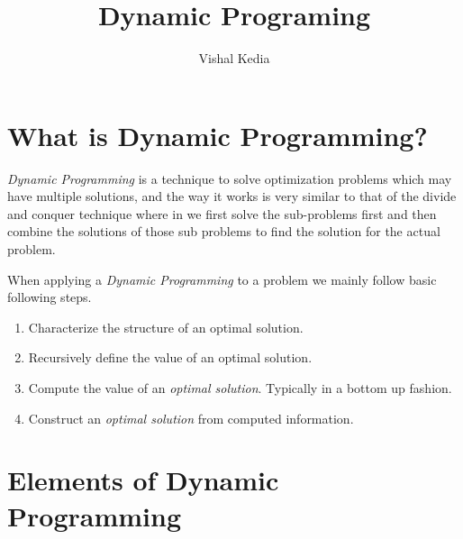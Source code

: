 \documentclass[10pt,a4paper,draft]{article}
\author{Vishal Kedia}
\title{Dynamic Programing}
\begin{document}
\maketitle
\section{What is Dynamic Programming?}
\emph{Dynamic Programming} is a technique to solve optimization problems which may have multiple solutions, and the way it works is very similar to that of the divide and conquer technique where in we first solve the sub-problems first and then combine the solutions of those sub problems to find the solution for the actual problem. 

When applying a \emph{Dynamic Programming} to a problem we mainly follow basic following steps.

\begin{enumerate}
\item Characterize the structure of an optimal solution.
\item Recursively define the value of an optimal solution.
\item Compute the value of an \emph{optimal solution}. Typically in a bottom up fashion. 
\item Construct an \emph{optimal solution} from computed information.
\end{enumerate}
\section{Elements of Dynamic Programming}
\end{document}
